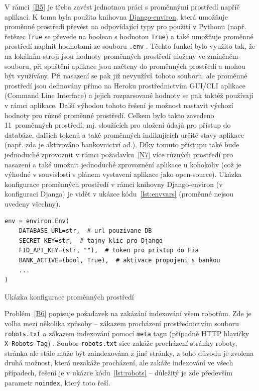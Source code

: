 V rámci~\ref{B5} je třeba zavést jednotnou práci s proměnnými prostředí napříč aplikací. K tomu byla použita knihovna \href{https://django-environ.readthedocs.io/en/latest/}{Django-environ}, která umožňuje proměnné prostředí převést na odpovídající typy pro použití v Pythonu (např. řetězec \verb|True| se převede na boolean s hodnotou \verb|True|) a také umožňuje proměnné prostředí naplnit hodnotami ze souboru \verb|.env| \cite{django-environ}. Těchto funkcí bylo využito tak, že na lokálním stroji jsou hodnoty proměnných prostředí uloženy ve zmíněném souboru, při spuštění aplikace jsou načteny do proměnných prostředí a mohou být využívány. Při nasazení se pak již nevyužívá tohoto souboru, ale proměnné prostředí jsou definovány přímo na Heroku prostřednictvím GUI/CLI aplikace (Command Line Interface) a jejich rozparsované hodnoty se pak taktéž používají v rámci aplikace. Další výhodou tohoto řešení je možnost nastavit výchozí hodnoty pro různé proměnné prostředí. Celkem bylo takto zavedeno 11~proměnných prostředí, mj. sloužících pro uložení údajů pro přístup do databáze, dalších tokenů a také proměnných indikujících určité stavy aplikace (např. zda je aktivováno bankovnictví ad.). Díky tomuto přístupu také bude jednoduché zprovoznit v rámci požadavku~\ref{N7} více různých prostředí pro nasazení a také umožnit jednoduché zprovoznění aplikace u kohokoliv (což je výhodné v souvislosti s plánem vystavení aplikace jako open-source). Ukázka konfigurace proměnných prostředí v rámci knihovny Django-environ (v konfiguraci Djanga) je vidět v ukázce kódu~\ref{lst:envvars} (proměnné nejsou uvedeny všechny).

\begin{listing}[ht]
	\begin{verbatim}
env = environ.Env(
    DATABASE_URL=str,  # url pouzivane DB
    SECRET_KEY=str,  # tajny klic pro Django
    FIO_API_KEY=(str, ""),  # token pro pristup do Fia
    BANK_ACTIVE=(bool, True),  # aktivace propojeni s bankou
    ...
)
	\end{verbatim}
	\caption{Ukázka konfigurace proměnných prostředí}\label{lst:envvars}
\end{listing}

Problém~\ref{B6} popisuje požadavek na zakázání indexování všem robotům. Zde je volba mezi několika způsoby -- zákazem procházení prostřednictvím souboru \verb|robots.txt| a zákazem indexování pomocí \verb|meta| tagu (případně HTTP hlavičky \verb|X-Robots-Tag|) \cite{roboti}. Soubor \verb|robots.txt| sice zakáže procházení stránky roboty, stránka ale stále může být zaindexována z jiné stránky, z toho důvodu je zvolena druhá možnost, která nezakáže procházení, ale zakáže indexování ve všech případech, řešení je v ukázce kódu~\ref{lst:robots} -- důležitý je zde především parametr \verb|noindex|, který toto řeší. 

